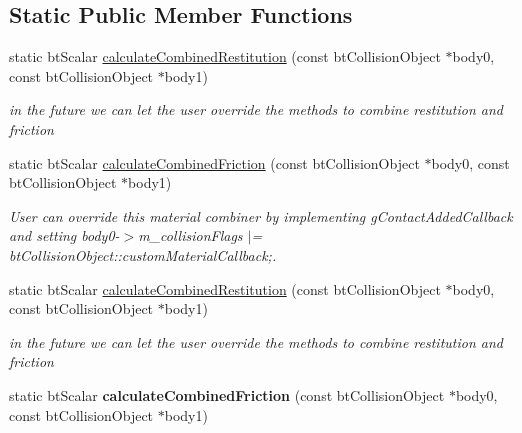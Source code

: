 \subsection*{Static Public Member Functions}
\begin{DoxyCompactItemize}
\item 
\mbox{\label{classbtManifoldResult_aa4419fc3b0d13ccc2cbfd7739b047c04}} 
static bt\+Scalar \hyperlink{classbtManifoldResult_aa4419fc3b0d13ccc2cbfd7739b047c04}{calculate\+Combined\+Restitution} (const bt\+Collision\+Object $\ast$body0, const bt\+Collision\+Object $\ast$body1)
\begin{DoxyCompactList}\small\item\em in the future we can let the user override the methods to combine restitution and friction \end{DoxyCompactList}\item 
\mbox{\label{classbtManifoldResult_a162717dce3ef3a756ae55ec04a179ed5}} 
static bt\+Scalar \hyperlink{classbtManifoldResult_a162717dce3ef3a756ae55ec04a179ed5}{calculate\+Combined\+Friction} (const bt\+Collision\+Object $\ast$body0, const bt\+Collision\+Object $\ast$body1)
\begin{DoxyCompactList}\small\item\em User can override this material combiner by implementing g\+Contact\+Added\+Callback and setting body0-\/$>$m\+\_\+collision\+Flags $\vert$= bt\+Collision\+Object\+::custom\+Material\+Callback;. \end{DoxyCompactList}\item 
\mbox{\label{classbtManifoldResult_a470c79d121cf7f324e3545bd0006ce62}} 
static bt\+Scalar \hyperlink{classbtManifoldResult_a470c79d121cf7f324e3545bd0006ce62}{calculate\+Combined\+Restitution} (const bt\+Collision\+Object $\ast$body0, const bt\+Collision\+Object $\ast$body1)
\begin{DoxyCompactList}\small\item\em in the future we can let the user override the methods to combine restitution and friction \end{DoxyCompactList}\item 
\mbox{\label{classbtManifoldResult_a56cb1cd539f0a1ad775296937fe96cc4}} 
static bt\+Scalar {\bfseries calculate\+Combined\+Friction} (const bt\+Collision\+Object $\ast$body0, const bt\+Collision\+Object $\ast$body1)
\end{DoxyCompactItemize}
